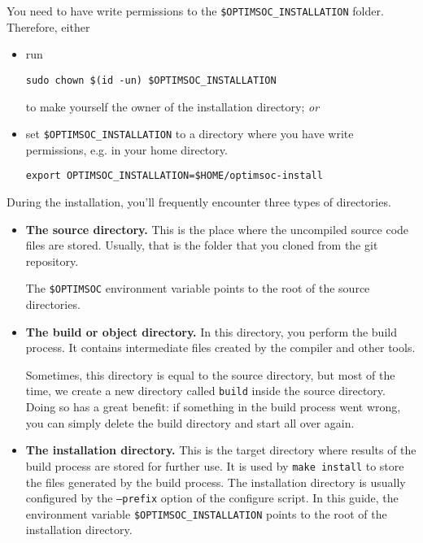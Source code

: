 \begin{docnote}
You need to have write permissions to the \verb|$OPTIMSOC_INSTALLATION| folder.
Therefore, either
\begin{itemize}
 \item run \begin{lstlisting}
sudo chown $(id -un) $OPTIMSOC_INSTALLATION
\end{lstlisting}
 to make yourself the owner of the installation directory; \textit{or}
 \item set \verb|$OPTIMSOC_INSTALLATION| to a directory where you have
   write permissions, e.g. in your home directory.
   \begin{lstlisting}
export OPTIMSOC_INSTALLATION=$HOME/optimsoc-install
   \end{lstlisting}
\end{itemize}

\end{docnote}


\begin{docnote}
During the installation, you'll frequently encounter three types of directories.
\begin{itemize}
 \item \textbf{The source directory.} This is the place where the
   uncompiled source code files are stored. Usually, that is the folder that
   you cloned from the git repository.

   The \verb|$OPTIMSOC| environment variable points to the root of the source
   directories.
 \item \textbf{The build or object directory.} In this directory, you perform
   the build process. It contains intermediate files created by the compiler and
   other tools.

   Sometimes, this directory is equal to the source directory, but
   most of the time, we create a new directory called \texttt{build} inside the
   source directory. Doing so has a great benefit: if something in the build
   process went wrong, you can simply delete the build directory and start all
   over again.
 \item \textbf{The installation directory.} This is the target directory where
   results of the build process are stored for further use. It is used by
   \texttt{make install} to store the files generated by
   the build process. The installation directory is usually configured by the
   \texttt{--prefix} option of the configure script. In this guide, the
   environment variable \verb|$OPTIMSOC_INSTALLATION| points to the root of the
   installation directory.
\end{itemize}

\end{docnote}


